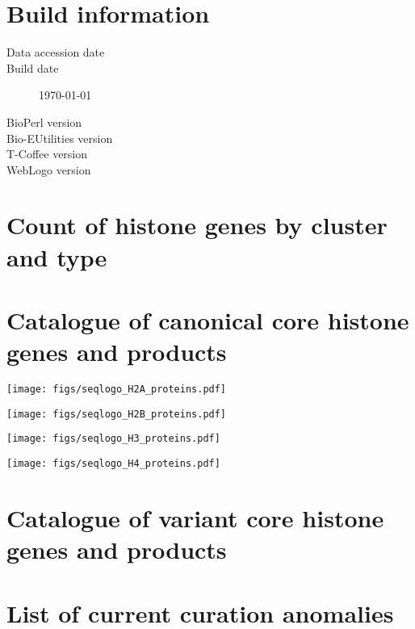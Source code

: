 \documentclass[a4paper,oneside,onecolumn,article]{memoir}
\begin{document}
  \section*{Build information}
  \begin{description}
    \item[Data accession date] \hfill \newline
      \printdate{\SequencesDate}
    \item[Build date] \hfill \newline
      \today
    \item[BioPerl version] \hfill \newline
      \BioPerlVersion{}
    \item[Bio-EUtilities version] \hfill \newline
      \BioEUtilitiesVersion
    \item[T-Coffee version] \hfill \newline
      \TCoffeVersion
    \item[WebLogo version] \hfill \newline
      \WebLogoVersion
  \end{description}

  \section*{Count of histone genes by cluster and type}
  

  \newpage
  \section*{Catalogue of canonical core histone genes and products}
  

  \newpage
  
  \texttt{[image: figs/seqlogo\_H2A\_proteins.pdf]}

  \newpage
  
  \texttt{[image: figs/seqlogo\_H2B\_proteins.pdf]}

  \newpage
  
  \texttt{[image: figs/seqlogo\_H3\_proteins.pdf]}

  \newpage
  
  \texttt{[image: figs/seqlogo\_H4\_proteins.pdf]}

  \newpage
  \section*{Catalogue of variant core histone genes and products}
  

  \newpage
  \section*{List of current curation anomalies}
  \begin{itemize}
  
  \end{itemize}
\end{document}
